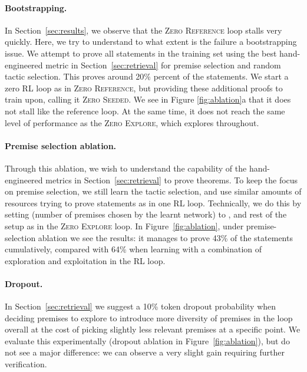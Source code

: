 \documentclass{article}
\begin{document}
\paragraph{Bootstrapping.}
In Section~\ref{sec:results}, we observe that the \textsc{Zero Reference} loop stalls very quickly. Here, we try to understand to what extent is the failure a bootstrapping issue.
We attempt to prove all statements in the training set using the best hand-engineered metric in Section~\ref{sec:retrieval} for premise selection and random tactic selection. This proves around 20\% percent of the statements.
We start a zero RL loop as in \textsc{Zero Reference}, but providing these additional proofs to train upon, calling it \textsc{Zero Seeded}.
We see in Figure \ref{fig:ablation}a that it does not stall like the reference loop.
At the same time, it does not reach the same level of performance as the \textsc{Zero Explore}, which explores throughout.

\vspace{-2mm}
\paragraph{Premise selection ablation.}
Through this ablation, we wish to understand the capability of the hand-engineered metrics in Section~\ref{sec:retrieval} to prove theorems.
To keep the focus on premise selection, we still learn the tactic selection, and use similar amounts of resources trying to prove statements as in one RL loop.
Technically, we do this by setting  (number of premises chosen by the learnt network) to , and rest of the setup as in the \textsc{Zero Explore} loop.
In Figure~\ref{fig:ablation}, under premise-selection ablation we see the results: it manages to prove 43\% of the statements cumulatively, compared with 64\% when learning with a combination of exploration and exploitation in the RL loop.

\vspace{-2mm}
\paragraph{Dropout.}
In Section~\ref{sec:retrieval} we suggest a 10\% token dropout probability when
deciding premises to explore to introduce more diversity of premises in the loop
overall at the cost of picking slightly less relevant premises at a specific point.
We evaluate this experimentally (dropout ablation in Figure~\ref{fig:ablation}),
but do not see a major difference: we can observe a very slight gain requiring further verification.
\end{document}
